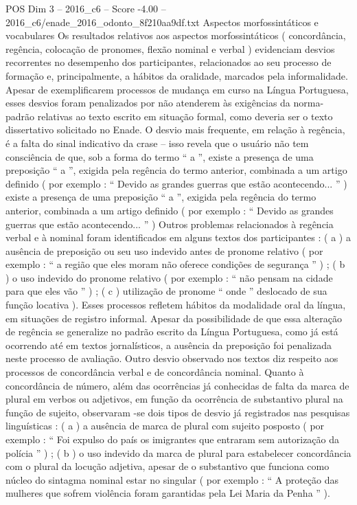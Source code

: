 \begin{textsample}{POS Dim 3 – 2016\_c6 – Score -4.00 – 2016\_c6/enade\_2016\_odonto\_8f210aa9df.txt}
Aspectos morfossintáticos e vocabulares Os resultados relativos aos aspectos morfossintáticos ( concordância, regência, colocação de pronomes, flexão nominal e verbal ) evidenciam desvios recorrentes no desempenho dos participantes, relacionados ao seu processo de formação e, principalmente, a hábitos da oralidade, marcados pela informalidade.
Apesar de exemplificarem processos de mudança em curso na Língua Portuguesa, esses desvios foram penalizados por não atenderem às exigências da norma-padrão relativas ao texto escrito em situação formal, como deveria ser o texto dissertativo solicitado no Enade.
O desvio mais frequente, em relação à regência, é a falta do sinal indicativo da crase – isso revela que o usuário não tem consciência de que, sob a forma do termo “ a ”, existe a presença de uma preposição “ a ”, exigida pela regência do termo anterior, combinada a um artigo definido ( por exemplo : “ Devido as grandes guerras que estão acontecendo... ” ) existe a presença de uma preposição “ a ”, exigida pela regência do termo anterior, combinada a um artigo definido ( por exemplo : “ Devido as grandes guerras que estão acontecendo... ” ) Outros problemas relacionados à regência verbal e à nominal foram identificados em alguns textos dos participantes : ( a ) a ausência de preposição ou seu uso indevido antes de pronome relativo ( por exemplo : “ a região que eles moram não oferece condições de segurança ” ) ; ( b ) o uso indevido do pronome relativo ( por exemplo : “ não pensam na cidade para que eles vão ” ) ; ( c ) utilização de pronome “ onde ” deslocado de sua função locativa ).
Esses processos refletem hábitos da modalidade oral da língua, em situações de registro informal.
Apesar da possibilidade de que essa alteração de regência se generalize no padrão escrito da Língua Portuguesa, como já está ocorrendo até em textos jornalísticos, a ausência da preposição foi penalizada neste processo de avaliação.
Outro desvio observado nos textos diz respeito aos processos de concordância verbal e de concordância nominal.
Quanto à concordância de número, além das ocorrências já conhecidas de falta da marca de plural em verbos ou adjetivos, em função da ocorrência de substantivo plural na função de sujeito, observaram -se dois tipos de desvio já registrados nas pesquisas linguísticas : ( a ) a ausência de marca de plural com sujeito posposto ( por exemplo : “ Foi expulso do país os imigrantes que entraram sem autorização da polícia ” ) ; ( b ) o uso indevido da marca de plural para estabelecer concordância com o plural da locução adjetiva, apesar de o substantivo que funciona como núcleo do sintagma nominal estar no singular ( por exemplo : “ A proteção das mulheres que sofrem violência foram garantidas pela Lei Maria da Penha ” ).

\end{textsample}
